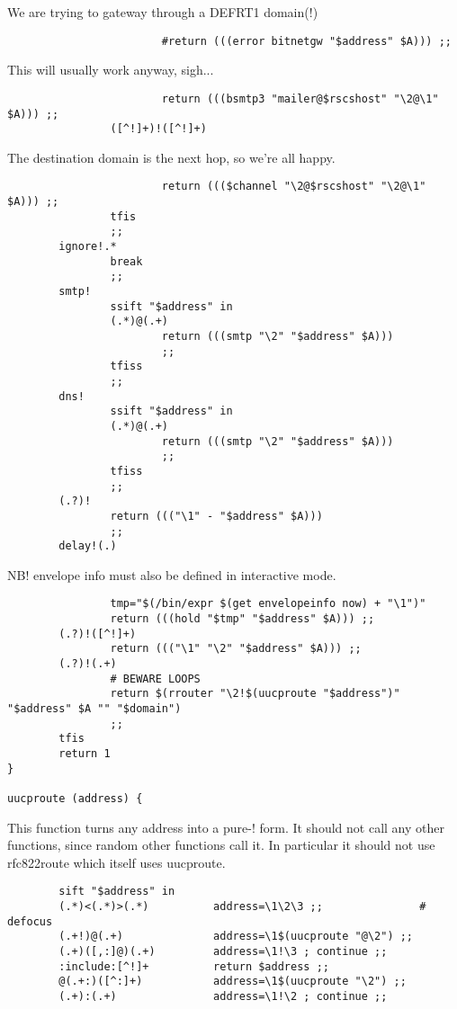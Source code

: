 We are trying to gateway through a DEFRT1 domain(!)

\begin{verbatim}
                        #return (((error bitnetgw "$address" $A))) ;;
\end{verbatim}


This will usually work anyway, sigh...

\begin{verbatim}
                        return (((bsmtp3 "mailer@$rscshost" "\2@\1" $A))) ;;
                ([^!]+)!([^!]+)
\end{verbatim}


The destination domain is the next hop, so we're all happy.

\begin{verbatim}
                        return ((($channel "\2@$rscshost" "\2@\1" $A))) ;;
                tfis
                ;;
        ignore!.*
                break
                ;;
        smtp!
                ssift "$address" in
                (.*)@(.+)
                        return (((smtp "\2" "$address" $A)))
                        ;;
                tfiss
                ;;
        dns!
                ssift "$address" in
                (.*)@(.+)
                        return (((smtp "\2" "$address" $A)))
                        ;;
                tfiss
                ;;
        (.?)!
                return ((("\1" - "$address" $A)))
                ;;
        delay!(.)
\end{verbatim}


NB! envelope info must also be defined in interactive mode.

\begin{verbatim}
                tmp="$(/bin/expr $(get envelopeinfo now) + "\1")"
                return (((hold "$tmp" "$address" $A))) ;;
        (.?)!([^!]+)
                return ((("\1" "\2" "$address" $A))) ;;
        (.?)!(.+)
                # BEWARE LOOPS
                return $(rrouter "\2!$(uucproute "$address")" "$address" $A "" "$domain")
                ;;
        tfis
        return 1
}

uucproute (address) {
\end{verbatim}


This function turns any address into a pure-! form.  It should not
call any other functions, since random other functions call it.
In particular it should not use rfc822route which itself uses
uucproute.

\begin{verbatim}
        sift "$address" in
        (.*)<(.*)>(.*)          address=\1\2\3 ;;               # defocus
        (.+!)@(.+)              address=\1$(uucproute "@\2") ;;
        (.+)([,:]@)(.+)         address=\1!\3 ; continue ;;
        :include:[^!]+          return $address ;;
        @(.+:)([^:]+)           address=\1$(uucproute "\2") ;;
        (.+):(.+)               address=\1!\2 ; continue ;;
\end{verbatim}

